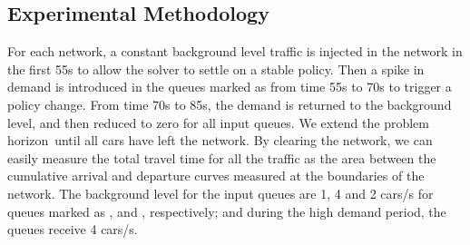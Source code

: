 \subsection{Experimental Methodology}



For each network, a constant background level traffic is injected in the network
in the first 55s to allow the solver to settle on a stable policy.
%
Then a spike in demand is introduced in the queues marked as \qVarTraf from time
55s to 70s to trigger a policy change.
%
%
From time 70s to 85s, the demand is returned to the background level, and then
reduced to zero for all input queues.
%
We extend the problem horizon~\TMAX until all cars have left the network.
%
By clearing the network, we can easily measure the total travel time for all the
traffic as the area between the cumulative arrival and departure curves measured
at the boundaries of the network.
%
%
The background level for the input queues are 1, 4 and 2 cars/s for queues
marked as \qLowTraf, \qHighTraf and \qVarTraf, respectively; and during the high
demand period, the queues \qVarTraf receive 4 cars/s.



